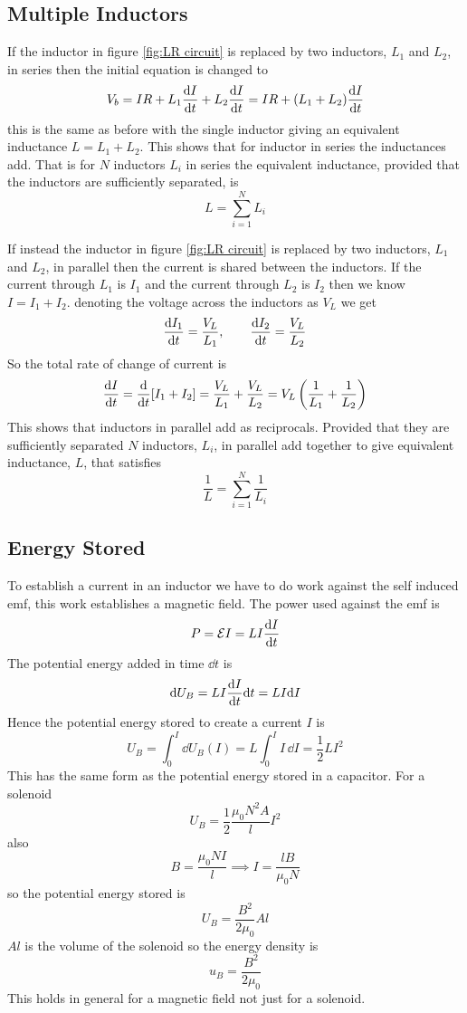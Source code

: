 \documentclass{article}
\newcommand{\emf}{\mathcal{E}}
\begin{document}
    \subsection{Multiple Inductors}
    If the inductor in figure \ref{fig:LR circuit} is replaced by two inductors, \(L_1\) and \(L_2\), in series then the initial equation is changed to
    \[V_b = IR + L_1\dv{I}{t} + L_2\dv{I}{t} = IR + (L_1 + L_2)\dv{I}{t}\]
    this is the same as before with the single inductor giving an equivalent inductance \(L = L_1 + L_2\).
    This shows that for inductor in series the inductances add.
    That is for \(N\) inductors \(L_i\) in series the equivalent inductance, provided that the inductors are sufficiently separated, is
    \[L = \sum_{i = 1}^N L_i\]
    
    If instead the inductor in figure \ref{fig:LR circuit} is replaced by two inductors, \(L_1\) and \(L_2\), in parallel then the current is shared between the inductors.
    If the current through \(L_1\) is \(I_1\) and the current through \(L_2\) is \(I_2\) then we know \(I = I_1 + I_2\).
    denoting the voltage across the inductors as \(V_L\) we get
    \[\dv{I_1}{t} = \frac{V_L}{L_1},\qquad \dv{I_2}{t} = \frac{V_L}{L_2}\]
    So the total rate of change of current is
    \[\dv{I}{t} = \dv{t}[I_1 + I_2] = \frac{V_L}{L_1} + \frac{V_L}{L_2} = V_L\left(\frac{1}{L_1} + \frac{1}{L_2}\right)\]
    This shows that inductors in parallel add as reciprocals.
    Provided that they are sufficiently separated \(N\) inductors, \(L_i\), in parallel add together to give equivalent inductance, \(L\), that satisfies
    \[\frac{1}{L} = \sum_{i = 1}^N \frac{1}{L_i}\]
    
    \subsection{Energy Stored}
    To establish a current in an inductor we have to do work against the self induced emf, this work establishes a magnetic field.
    The power used against the emf is
    \[P = \emf I = LI\dv{I}{t}\]
    The potential energy added in time \(\dd t\) is
    \[\dd U_B = LI\dv{I}{t}\dd t = LI\dd I\]
    Hence the potential energy stored to create a current \(I\) is
    \[U_B = \int_0^{I}\dd U_B(I) = L\int_0^I I\,\dd I = \frac{1}{2}LI^2\]
    This has the same form as the potential energy stored in a capacitor.
    For a solenoid
    \[U_B = \frac{1}{2}\frac{\mu_0N^2A}{l}I^2\]
    also
    \[B = \frac{\mu_0NI}{l}\implies I = \frac{lB}{\mu_0N}\]
    so the potential energy stored is
    \[U_B = \frac{B^2}{2\mu_0}Al\]
    \(Al\) is the volume of the solenoid so the energy density is
    \[u_B = \frac{B^2}{2\mu_0}\]
    This holds in general for a magnetic field not just for a solenoid.
    
\end{document}
